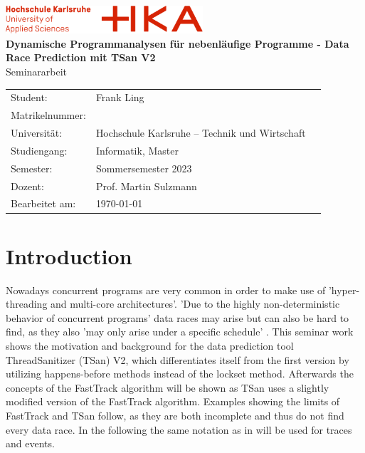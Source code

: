 \documentclass[12pt]{article}
\begin{document}
	\begin{titlepage}
		\begin{center}
			\includegraphics[width=0.55\textwidth]{images/hka-logo.png}\\[16ex]
			\LARGE{\textbf{Dynamische Programmanalysen für nebenläufige Programme - Data Race Prediction mit TSan V2}}\\[8ex]
			\Large{{Seminararbeit}}\\[14ex]
			\normalsize{}
			\begin{tabular}{lll}
				Student:            & \quad Frank Ling                                  & \\[2ex]
				Matrikelnummer:     & \quad 79496 & \\[2ex]     %
				Universität:        & \quad Hochschule Karlsruhe – Technik und Wirtschaft   &       \\[2ex]
				Studiengang:        & \quad Informatik, Master                &       \\[2ex]
				Semester:           & \quad Sommersemester 2023                             &       \\[2ex]
				Dozent:             & \quad Prof. Martin Sulzmann                       &       \\[2ex]
				Bearbeitet am:      & \quad \today                                  &       \\[2ex]
			\end{tabular}
		\end{center}
	\end{titlepage}
	\newpage
	\tableofcontents
	\newpage
	\section{Introduction}
	Nowadays concurrent programs are very common in order to make use of 'hyper-threading and multi-core architectures'\cite[p. 14]{SWB-1830643851}. 'Due to the highly non-deterministic behavior of concurrent programs' \cite[p. 1]{sulzmann} data races may arise but can also be hard to find, as they also 'may only arise under a specific schedule' \cite[p. 1]{sulzmann}. This seminar work shows the motivation and background for the data prediction tool ThreadSanitizer (TSan) V2, which differentiates itself from the first version by utilizing happens-before methods instead of the lockset method. Afterwards the concepts of the FastTrack \cite{cormac} algorithm will be shown as TSan uses a slightly modified version of the FastTrack algorithm. Examples showing the limits of FastTrack and TSan follow, as they are both incomplete and thus do not find every data race. In the following the same notation as in \cite{sulzmann} will be used for traces and events.
	
\end{document}
